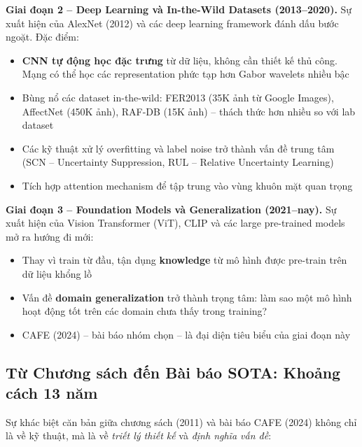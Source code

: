 \documentclass[12pt,a4paper]{article}
\let\oldtextbf\textbf
\renewcommand{\textbf}[1]{\oldtextbf{\textcolor{hcmublue}{#1}}}
\begin{document}
\textbf{Giai đoạn 2 -- Deep Learning và In-the-Wild Datasets (2013--2020).}
Sự xuất hiện của AlexNet (2012) và các deep learning framework đánh dấu bước ngoặt. Đặc điểm:
\begin{itemize}
    \item \textbf{CNN tự động học đặc trưng} từ dữ liệu, không cần thiết kế thủ công. Mạng có thể học các representation phức tạp hơn Gabor wavelets nhiều bậc
    \item Bùng nổ các dataset in-the-wild: FER2013 (35K ảnh từ Google Images), AffectNet (450K ảnh), RAF-DB (15K ảnh) -- thách thức hơn nhiều so với lab dataset
    \item Các kỹ thuật xử lý overfitting và label noise trở thành vấn đề trung tâm (SCN -- Uncertainty Suppression, RUL -- Relative Uncertainty Learning)
    \item Tích hợp attention mechanism để tập trung vào vùng khuôn mặt quan trọng
\end{itemize}

\textbf{Giai đoạn 3 -- Foundation Models và Generalization (2021--nay).}
Sự xuất hiện của Vision Transformer (ViT), CLIP và các large pre-trained models mở ra hướng đi mới:
\begin{itemize}
    \item Thay vì train từ đầu, tận dụng \textbf{knowledge} từ mô hình được pre-train trên dữ liệu khổng lồ
    \item Vấn đề \textbf{domain generalization} trở thành trọng tâm: làm sao một mô hình hoạt động tốt trên các domain chưa thấy trong training?
    \item CAFE (2024) -- bài báo nhóm chọn -- là đại diện tiêu biểu của giai đoạn này
\end{itemize}

\subsection{Từ Chương sách đến Bài báo SOTA: Khoảng cách 13 năm}

Sự khác biệt căn bản giữa chương sách (2011) và bài báo CAFE (2024) không chỉ là về kỹ thuật, mà là về \textit{triết lý thiết kế} và \textit{định nghĩa vấn đề}:
\end{document}
